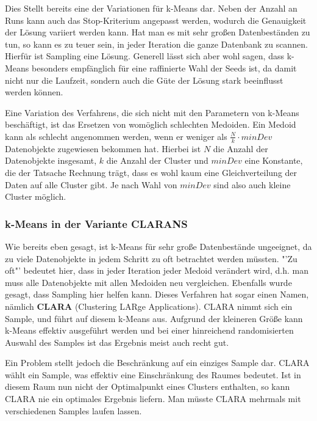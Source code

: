 Dies Stellt bereits eine der Variationen für k-Means dar. Neben der 
Anzahl an Runs kann auch das Stop-Kriterium angepasst werden,
wodurch die Genauigkeit der Lösung variiert werden kann. Hat man
es mit sehr großen Datenbeständen zu tun, so kann es zu teuer sein,
in jeder Iteration die ganze Datenbank zu scannen. Hierfür ist Sampling
eine Lösung. Generell lässt sich aber wohl sagen, dass k-Means 
besonders empfänglich für eine raffinierte Wahl der Seeds ist, da
damit nicht nur die Laufzeit, sondern auch die Güte der Lösung
stark beeinflusst werden können.

Eine Variation des Verfahrens, die sich nicht mit den Parametern
von k-Means beschäftigt, ist das Ersetzen von womöglich schlechten
Medoiden. Ein Medoid kann als schlecht angenommen werden, wenn er
weniger als \(\frac{N}{k} \cdot minDev\) Datenobjekte zugewiesen
bekommen hat. Hierbei ist \(N\) die Anzahl der Datenobjekte
insgesamt, \(k\) die Anzahl der Cluster und \(minDev\) eine 
Konstante, die der Tatsache Rechnung trägt, dass es wohl kaum eine
Gleichverteilung der Daten auf alle Cluster gibt. Je nach Wahl von
\(minDev\) sind also auch kleine Cluster möglich.

\subsubsection{k-Means in der Variante CLARANS}
Wie bereits eben gesagt, ist k-Means für sehr große Datenbestände
ungeeignet, da zu viele Datenobjekte in jedem Schritt 
zu oft betrachtet werden
müssten. "'Zu oft"' bedeutet hier, dass in jeder Iteration jeder Medoid
verändert wird, d.h. man muss alle Datenobjekte mit allen Medoiden
neu vergleichen. Ebenfalls wurde gesagt, dass Sampling hier helfen kann.
Dieses Verfahren hat sogar einen Namen, nämlich \textbf{CLARA}
(Clustering LARge Applications). CLARA nimmt sich ein Sample,
und führt auf diesem k-Means aus. Aufgrund der kleineren Größe
kann k-Means effektiv ausgeführt werden und bei einer hinreichend 
randomisierten Auswahl des Samples ist das Ergebnis meist auch
recht gut.

Ein Problem stellt jedoch die Beschränkung auf ein einziges Sample
dar. CLARA wählt ein Sample, was effektiv eine Einschränkung des
Raumes bedeutet. Ist in diesem Raum nun nicht der Optimalpunkt
eines Clusters enthalten, so kann CLARA nie ein optimales Ergebnis 
liefern. Man müsste CLARA mehrmals mit verschiedenen Samples
laufen lassen.

